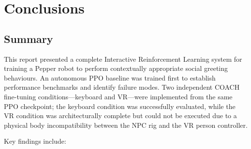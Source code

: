 \documentclass[../report.tex]{subfiles}
\begin{document}
    \section{Conclusions}
    \label{sec:conclusions}

    \subsection{Summary}
    \label{sec:conclusions:summary}

    This report presented a complete Interactive Reinforcement Learning system for training a Pepper robot to perform contextually appropriate social greeting behaviours. An autonomous PPO baseline was trained first to establish performance benchmarks and identify failure modes. Two independent COACH fine-tuning conditions---keyboard and VR---were implemented from the same PPO checkpoint; the keyboard condition was successfully evaluated, while the VR condition was architecturally complete but could not be executed due to a physical body incompatibility between the NPC rig and the VR person controller.

    Key findings include:
\end{document}
